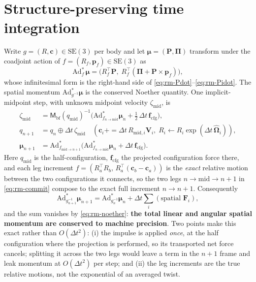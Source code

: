\documentclass[11pt]{article}
\newcommand{\SEthree}{\mathrm{SE}(3)}
\newcommand{\Adstar}{\mathrm{Ad}^{*}}
\newcommand{\Mmat}{\mathsf{M}}
\newcommand{\PP}{\mathbf{P}}
\newcommand{\PiP}{\bm{\Pi}}
\newcommand{\VV}{\mathbf{V}}
\newcommand{\Om}{\bm{\Omega}}
\newcommand{\muv}{\bm{\mu}}
\newcommand{\Fcfg}{\mathbf{F}}
\newcommand{\half}{\tfrac12}
\newcommand{\hatop}[1]{\widehat{#1}}
\begin{document}
\section{Structure-preserving time integration}
\label{sec:rm-integrator}

Write $g=(R,\mathbf c)\in\SEthree$ per body and let $\muv=(\PP,\PiP)$ transform
under the coadjoint action of $f=(R_f,\mathbf p_f)\in\SEthree$ as
\begin{equation}
\Adstar_f\,\muv=\big(R_f^\top\PP,\;R_f^\top(\PiP+\PP\times\mathbf p_f)\big),
\label{eq:rm-adstar}
\end{equation}
whose infinitesimal form is the right-hand side of
\eqref{eq:rm-Pdot}--\eqref{eq:rm-Pidot}. The spatial momentum
$\Adstar_{g^{-1}}\muv$ is the conserved Noether quantity. One implicit-midpoint
step, with unknown midpoint velocity $\zeta_{\mathrm{mid}}$, is
\begin{align}
\zeta_{\mathrm{mid}}
&=\Mmat_{\mathrm{bf}}(q_{\mathrm{mid}})^{-1}
   \Big(\Adstar_{f_{n\to\mathrm{mid}}}\muv_n+\half\,\Delta t\,\mathbf f_{\mathrm{cfg}}\Big),
   \label{eq:rm-fixedpoint}\\
q_{n+1}&=q_n\oplus\Delta t\,\zeta_{\mathrm{mid}}
  \quad(\mathbf c_i{+}{=}\Delta t\,R_{\mathrm{mid},i}\VV_i,\;
        R_i\!\leftarrow\!R_i\exp(\Delta t\,\hatop{\Om}_i)),\label{eq:rm-config}\\
\muv_{n+1}&=\Adstar_{f_{\mathrm{mid}\to n+1}}
   \Big(\Adstar_{f_{n\to\mathrm{mid}}}\muv_n+\Delta t\,\mathbf f_{\mathrm{cfg}}\Big).
   \label{eq:rm-commit}
\end{align}
Here $q_{\mathrm{mid}}$ is the half-configuration, $\mathbf f_{\mathrm{cfg}}$ the
projected configuration force there, and each leg increment
$f=(R_a^\top R_b,\,R_a^\top(\mathbf c_b-\mathbf c_a))$ is the \emph{exact} relative
motion between the two configurations it connects, so the two legs
$n\!\to\!\mathrm{mid}\!\to\!n{+}1$ in \eqref{eq:rm-commit} compose to the exact
full increment $n\!\to\!n{+}1$. Consequently
\begin{equation}
\Adstar_{g_{n+1}^{-1}}\muv_{n+1}
 =\Adstar_{g_n^{-1}}\muv_n+\Delta t\sum_i(\text{spatial }\Fcfg_i),
\end{equation}
and the sum vanishes by \eqref{eq:rm-noether}: \textbf{the total linear and
angular spatial momentum are conserved to machine precision}. Two points make
this exact rather than $O(\Delta t^2)$: (i) the impulse is applied \emph{once},
at the half configuration where the projection is performed, so its
transported net force cancels; splitting it across the two legs would leave a
term in the $n{+}1$ frame and leak momentum at $O(\Delta t^2)$ per step; and
(ii) the leg increments are the true relative motions, not the exponential of an
averaged twist.
\end{document}
